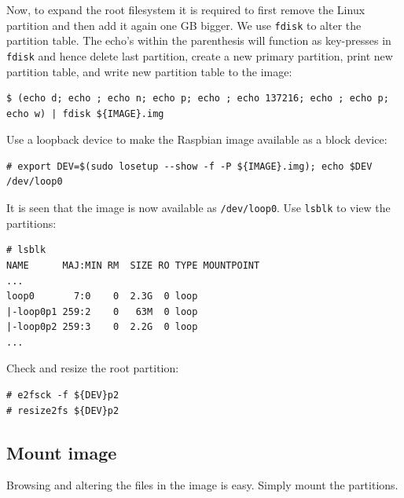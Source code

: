 Now, to expand the root filesystem it is required to first remove the Linux partition
and then add it again one \ac{GB} bigger.
We use \texttt{fdisk} to alter the partition table. The echo's within the parenthesis
will function as
key-presses in \texttt{fdisk} and hence delete last partition, create a new
primary partition, print new partition table, and write new partition table
to the image:

\begin{lstlisting}[]
$ (echo d; echo ; echo n; echo p; echo ; echo 137216; echo ; echo p; echo w) | fdisk ${IMAGE}.img
\end{lstlisting}
\FloatBarrier
\vspace{-5mm}

Use a loopback device to make the Raspbian image available as a block device: 
\begin{lstlisting}[]
# export DEV=$(sudo losetup --show -f -P ${IMAGE}.img); echo $DEV
/dev/loop0
\end{lstlisting}
\FloatBarrier
\vspace{-5mm}

It is seen that the image is now available as \texttt{/dev/loop0}. Use \texttt{lsblk}
to view the partitions:

\begin{lstlisting}[]
# lsblk
NAME      MAJ:MIN RM  SIZE RO TYPE MOUNTPOINT
...
loop0       7:0    0  2.3G  0 loop 
|-loop0p1 259:2    0   63M  0 loop 
|-loop0p2 259:3    0  2.2G  0 loop
...
\end{lstlisting}
\FloatBarrier
\vspace{-5mm}

Check and resize the root partition:
\begin{lstlisting}[]
# e2fsck -f ${DEV}p2
# resize2fs ${DEV}p2
\end{lstlisting}
\FloatBarrier



\subsection{Mount image}

Browsing and altering the files in the image is easy. Simply mount the partitions.

